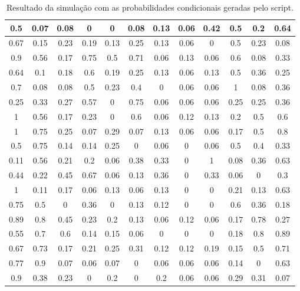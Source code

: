 \begin{table}[H]
\caption{Resultado da simulação com as probabilidades condicionais geradas pelo script.}
\label{q.res1}
\centering
\begin{tabular}{|c|c|c|c|c|c|c|c|c|c|c|c|}
\hline
0.5  & 0.07 & 0.08 & 0    & 0    & 0.08 & 0.13 & 0.06 & 0.42 & 0.5  & 0.2  & 0.64 \\ \hline
0.67 & 0.15 & 0.23 & 0.19 & 0.13 & 0.25 & 0.13 & 0.06 & 0    & 0.5  & 0.23 & 0.08 \\ \hline
0.9  & 0.56 & 0.17 & 0.75 & 0.5  & 0.71 & 0.06 & 0.13 & 0.06 & 0.6  & 0.08 & 0.33 \\ \hline
0.64 & 0.1  & 0.18 & 0.6  & 0.19 & 0.25 & 0.13 & 0.06 & 0.13 & 0.5  & 0.36 & 0.25 \\ \hline
0.7  & 0.08 & 0.08 & 0.5  & 0.23 & 0.4  & 0    & 0.06 & 0.06 & 1    & 0.08 & 0.36 \\ \hline
0.25 & 0.33 & 0.27 & 0.57 & 0    & 0.75 & 0.06 & 0.06 & 0.06 & 0.25 & 0.25 & 0.36 \\ \hline
1    & 0.56 & 0.17 & 0.23 & 0    & 0.6  & 0.06 & 0.12 & 0.13 & 0.2  & 0.5  & 0.6  \\ \hline
1    & 0.75 & 0.25 & 0.07 & 0.29 & 0.07 & 0.13 & 0.06 & 0.06 & 0.17 & 0.5  & 0.8  \\ \hline
0.5  & 0.75 & 0.14 & 0.14 & 0.25 & 0    & 0.06 & 0    & 0.06 & 0.5  & 0.4  & 0.33 \\ \hline
0.11 & 0.56 & 0.21 & 0.2  & 0.06 & 0.38 & 0.33 & 0    & 1    & 0.08 & 0.36 & 0.63 \\ \hline
0.44 & 0.22 & 0.45 & 0.67 & 0.06 & 0.13 & 0.36 & 0    & 0.33 & 0.06 & 0    & 0.3  \\ \hline
1    & 0.11 & 0.17 & 0.06 & 0.13 & 0.06 & 0.13 & 0    & 0    & 0.21 & 0.13 & 0.63 \\ \hline
0.75 & 0.5  & 0    & 0.36 & 0    & 0.13 & 0.12 & 0    & 0    & 0.6  & 0.36 & 0.18 \\ \hline
0.89 & 0.8  & 0.45 & 0.23 & 0.2  & 0.13 & 0.06 & 0.12 & 0.06 & 0.17 & 0.78 & 0.27 \\ \hline
0.55 & 0.7  & 0.6  & 0.14 & 0.15 & 0.06 & 0    & 0    & 0    & 0.18 & 0.8  & 0.89 \\ \hline
0.67 & 0.73 & 0.17 & 0.21 & 0.25 & 0.31 & 0.12 & 0.12 & 0.19 & 0.15 & 0.5  & 0.71 \\ \hline
0.77 & 0.9  & 0.07 & 0.06 & 0.07 & 0    & 0.06 & 0.06 & 0.06 & 0.14 & 0    & 0.63 \\ \hline
0.9  & 0.38 & 0.23 & 0    & 0.2  & 0    & 0.2  & 0.06 & 0.06 & 0.29 & 0.31 & 0.07 \\ \hline

\end{tabular}
\end{table}
